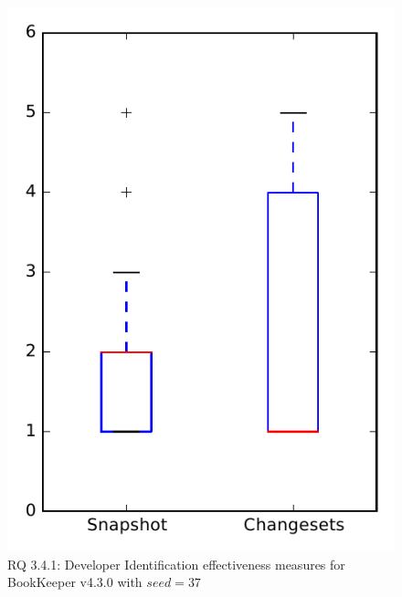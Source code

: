 
\begin{figure}
\centering
\includegraphics[height=0.4\textheight]{figures/dit_seed/rq1_bookkeeper_37}
\caption{RQ 3.4.1: Developer Identification effectiveness measures for BookKeeper v4.3.0 with $seed=37$}
\label{fig:dit_seed:rq1:bookkeeper}
\end{figure}
